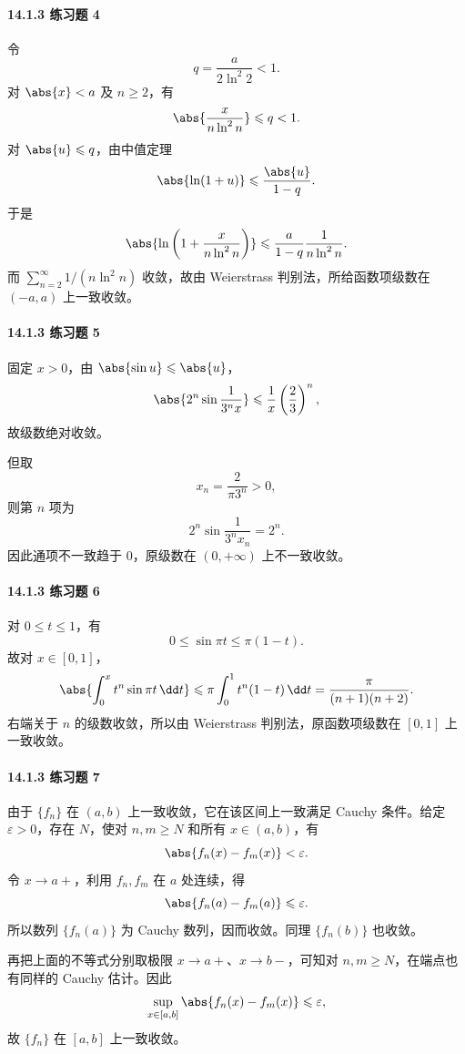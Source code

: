\paragraph{14.1.3 练习题 4}
\begin{xsolution}
令
\[
  q=\frac{a}{2\ln^2 2}<1.
\]
对 $\abs{x}<a$ 及 $n\geqslant2$，有
\[
  \abs{\frac{x}{n\ln^2n}}\leqslant q<1.
\]
对 $\abs{u}\leqslant q$，由中值定理
\[
  \abs{\ln(1+u)}\leqslant\frac{\abs{u}}{1-q}.
\]
于是
\[
  \abs{\ln\left(1+\frac{x}{n\ln^2n}\right)}
  \leqslant\frac{a}{1-q}\frac1{n\ln^2n}.
\]
而 $\sum_{n=2}^{\infty}1/(n\ln^2n)$ 收敛，故由 Weierstrass 判别法，所给函数项级数在 $(-a,a)$ 上一致收敛。
\end{xsolution}

\paragraph{14.1.3 练习题 5}
\begin{xsolution}
固定 $x>0$，由 $\abs{\sin u}\leqslant\abs{u}$，
\[
  \abs{2^n\sin\frac1{3^nx}}
  \leqslant\frac1x\left(\frac23\right)^n,
\]
故级数绝对收敛。

但取
\[
  x_n=\frac{2}{\pi3^n}>0,
\]
则第 $n$ 项为
\[
  2^n\sin\frac1{3^n x_n}=2^n.
\]
因此通项不一致趋于 $0$，原级数在 $(0,+\infty)$ 上不一致收敛。
\end{xsolution}

\paragraph{14.1.3 练习题 6}
\begin{xsolution}
对 $0\leqslant t\leqslant1$，有
\[
  0\leqslant\sin\pi t\leqslant\pi(1-t).
\]
故对 $x\in[0,1]$，
\[
  \abs{\int_0^x t^n\sin\pi t\,\dd t}
  \leqslant\pi\int_0^1 t^n(1-t)\,\dd t
  =\frac{\pi}{(n+1)(n+2)}.
\]
右端关于 $n$ 的级数收敛，所以由 Weierstrass 判别法，原函数项级数在 $[0,1]$ 上一致收敛。
\end{xsolution}

\paragraph{14.1.3 练习题 7}
\begin{xsolution}
由于 $\{f_n\}$ 在 $(a,b)$ 上一致收敛，它在该区间上一致满足 Cauchy 条件。给定 $\varepsilon>0$，存在 $N$，使对 $n,m\geqslant N$ 和所有 $x\in(a,b)$，有
\[
  \abs{f_n(x)-f_m(x)}<\varepsilon.
\]
令 $x\to a+$，利用 $f_n,f_m$ 在 $a$ 处连续，得
\[
  \abs{f_n(a)-f_m(a)}\leqslant\varepsilon.
\]
所以数列 $\{f_n(a)\}$ 为 Cauchy 数列，因而收敛。同理 $\{f_n(b)\}$ 也收敛。

再把上面的不等式分别取极限 $x\to a+$、$x\to b-$，可知对 $n,m\geqslant N$，在端点也有同样的 Cauchy 估计。因此
\[
  \sup_{x\in[a,b]}\abs{f_n(x)-f_m(x)}\leqslant\varepsilon,
\]
故 $\{f_n\}$ 在 $[a,b]$ 上一致收敛。
\end{xsolution}

